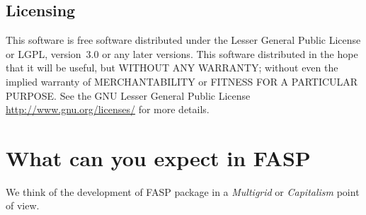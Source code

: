 \documentclass[11pt]{memoir}
\begin{document}
\subsection{Licensing}

This software is free software distributed under the Lesser General Public 
License or LGPL, version~3.0 or any later versions. This software distributed 
in the hope that it will be useful, but WITHOUT ANY WARRANTY; without even 
the implied warranty of MERCHANTABILITY or FITNESS FOR A PARTICULAR PURPOSE. See the GNU Lesser General Public License \url{http://www.gnu.org/licenses/} for more details.



\section{What can you expect in FASP}

We think of the development of FASP package in a \emph{Multigrid} or \emph{Capitalism} point of view.
\end{document}
